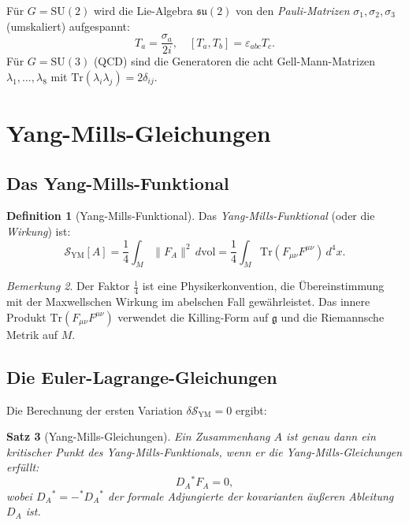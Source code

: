 \documentclass[12pt,a4paper]{amsart}
\newtheorem{theorem}{Satz}[section]
\theoremstyle{definition}
\newtheorem{definition}[theorem]{Definition}
\theoremstyle{remark}
\newtheorem{remark}[theorem]{Bemerkung}
\begin{document}
Für $G = \mathrm{SU}(2)$ wird die Lie-Algebra $\mathfrak{su}(2)$ von den
\emph{Pauli-Matrizen} $\sigma_1, \sigma_2, \sigma_3$ (umskaliert) aufgespannt:
\[
  T_a = \frac{\sigma_a}{2i}, \quad [T_a, T_b] = \varepsilon_{abc} T_c.
\]
Für $G = \mathrm{SU}(3)$ (QCD) sind die Generatoren die acht Gell-Mann-Matrizen
$\lambda_1, \ldots, \lambda_8$ mit $\mathrm{Tr}(\lambda_i \lambda_j) = 2\delta_{ij}$.

\section{Yang-Mills-Gleichungen}
\label{sec:ym-gl}

\subsection{Das Yang-Mills-Funktional}

\begin{definition}[Yang-Mills-Funktional]
Das \emph{Yang-Mills-Funktional} (oder die \emph{Wirkung}) ist:
\[
  \mathcal{S}_{\mathrm{YM}}[A] = \frac{1}{4} \int_M \|F_A\|^2 \, d\mathrm{vol}
  = \frac{1}{4} \int_M \mathrm{Tr}(F_{\mu\nu} F^{\mu\nu}) \, d^4x.
\]
\end{definition}

\begin{remark}
Der Faktor $\frac{1}{4}$ ist eine Physikerkonvention, die Übereinstimmung mit der
Maxwellschen Wirkung im abelschen Fall gewährleistet. Das innere Produkt
$\mathrm{Tr}(F_{\mu\nu} F^{\mu\nu})$ verwendet die Killing-Form auf $\mathfrak{g}$
und die Riemannsche Metrik auf $M$.
\end{remark}

\subsection{Die Euler-Lagrange-Gleichungen}

Die Berechnung der ersten Variation $\delta \mathcal{S}_{\mathrm{YM}} = 0$ ergibt:

\begin{theorem}[Yang-Mills-Gleichungen]
\label{satz:ym-gleichungen}
Ein Zusammenhang $A$ ist genau dann ein kritischer Punkt des Yang-Mills-Funktionals,
wenn er die \emph{Yang-Mills-Gleichungen} erfüllt:
\[
  D_A{}^* F_A = 0,
\]
wobei $D_A{}^* = -{}^* D_A {}^*$ der formale Adjungierte der kovarianten äußeren
Ableitung $D_A$ ist.
\end{theorem}
\end{document}
